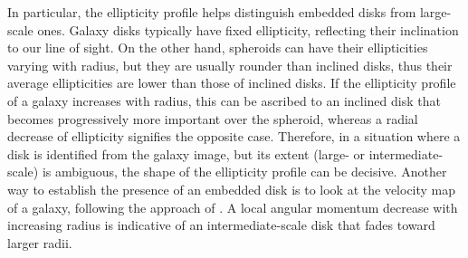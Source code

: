 \documentclass[preprint2]{emulateapj}
\begin{document}
In particular, the ellipticity profile helps distinguish embedded disks from large-scale ones.
Galaxy disks typically have fixed ellipticity, reflecting their inclination to our line of sight.
On the other hand, spheroids can have their ellipticities varying with radius,
but they are usually rounder than inclined disks, thus their average ellipticities are lower than those of inclined disks.
If the ellipticity profile of a galaxy increases with radius, 
this can be ascribed to an inclined disk that becomes progressively more important over the spheroid,
whereas a radial decrease of ellipticity signifies the opposite case.
Therefore, in a situation where a disk is identified from the galaxy image, 
but its extent (large- or intermediate-scale) is ambiguous,
the shape of the ellipticity profile can be decisive. 
Another way to establish the presence of an embedded disk is to look at the velocity map of a galaxy,
following the approach of \citet{arnold2014}. 
A local angular momentum decrease with increasing radius is indicative of an intermediate-scale disk 
that fades toward larger radii. \\
\end{document}

